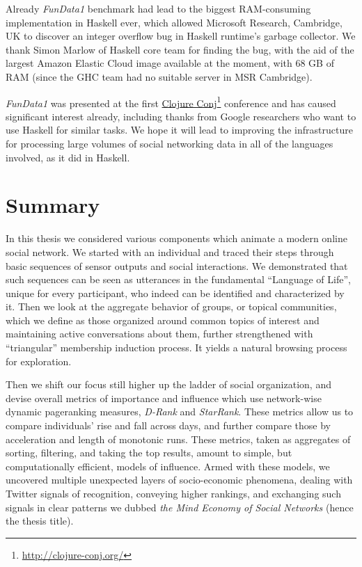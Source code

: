 \documentclass[10pt,oneside]{memoir}
\begin{document}
Already {\itshape FunData1} benchmark had lead to the biggest RAM-consuming implementation in Haskell ever, which allowed Microsoft Research, Cambridge, UK to discover an integer overflow bug in Haskell runtime's garbage collector.  We thank Simon Marlow of Haskell core team for finding the bug, with the aid of the largest Amazon Elastic Cloud image available at the moment, with 68 GB of RAM (since the GHC team had no suitable server in MSR Cambridge).


{\itshape FunData1} was presented at the first \href{http://clojure-conj.org/}{Clojure Conj}\footnote{\href{http://clojure-conj.org/}{http://clojure-conj.org/}} conference and has caused significant interest already, including thanks from Google researchers who want to use Haskell for similar tasks.  We hope it will lead to improving the infrastructure for processing large volumes of social networking data in all of the languages involved, as it did in Haskell.


\pagebreak \chapter{Summary}
\label{summary}

In this thesis we considered various components which animate a modern online social network.  We started with an individual and traced their steps through basic sequences of sensor outputs and social interactions.  We demonstrated that such sequences can be seen as utterances in the fundamental ``Language of Life'', unique for every participant, who indeed can be identified and characterized by it.  Then we look at the aggregate behavior of groups, or topical communities, which we define as those organized around common topics of interest and maintaining active conversations about them, further strengthened with ``triangular'' membership induction process.  It yields a natural browsing process for exploration.  


Then we shift our focus still higher up the ladder of social organization, and devise overall metrics of importance and influence which use network-wise dynamic pageranking measures, {\itshape D-Rank} and {\itshape StarRank}.  These metrics allow us to compare individuals' rise and fall across days, and further compare those by acceleration and length of monotonic runs.  These metrics, taken as aggregates of sorting, filtering, and taking the top results, amount to simple, but computationally efficient, models of influence.  Armed with these models, we uncovered multiple unexpected layers of socio-economic phenomena, dealing with Twitter signals of recognition, conveying higher rankings, and exchanging such signals in clear patterns we dubbed {\itshape the Mind Economy of Social Networks} (hence the thesis title).
\end{document}
